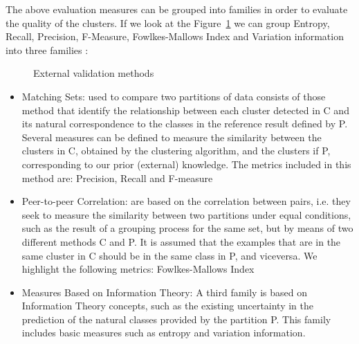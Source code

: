 The above evaluation measures can be grouped into families in order to evaluate the quality of the clusters. If we look at the Figure~\ref{fig:external} we can group Entropy, Recall, Precision, F-Measure, Fowlkes-Mallows Index and Variation information into three families \cite{b54}:

\begin{figure}[htbp]
  \centering
    \caption{External validation methods \cite{b54}}%
    \label{fig:external}%
\end{figure}

\begin{itemize}
  \item Matching Sets: \cite{b54} used to compare two partitions of data consists of those method that identify the relationship between each cluster detected in C and its natural correspondence to the classes in the reference result defined by P.\\
Several measures can be defined to measure the similarity between the clusters in C, obtained by the clustering algorithm, and the clusters if P, corresponding to our prior (external) knowledge. The metrics included in this method are: Precision, Recall and F-measure
  \item Peer-to-peer Correlation: \cite{b54} are based on the correlation between pairs, i.e. they seek to measure the similarity between two partitions under equal conditions, such as the result of a grouping process for the same set, but by means of two different methods C and P. It is assumed that the examples that are in the same cluster in C should be in the same class in P, and viceversa. We highlight the following metrics: Fowlkes-Mallows Index
  \item Measures Based on Information Theory: \cite{b54} A third family is based on Information Theory concepts, such as the existing uncertainty in the prediction of the natural classes provided by the partition P. This family includes basic measures such as entropy and variation information.
\end{itemize}

